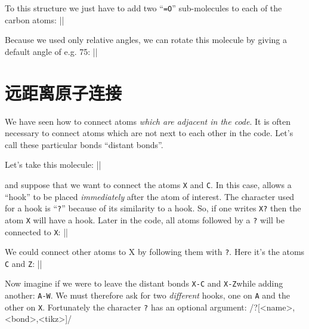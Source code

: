 \documentclass[10pt]{article}
\begin{document}
To this structure we just have to add two ``\verb/=O/'' sub-molecules to each of the carbon atoms:
||

Because we used only relative angles, we can rotate this molecule by giving a default angle of e.g. 75\degres:
||

\section{远距离原子连接}
We have seen how to connect atoms \emph{which are adjacent in the code}. It is often necessary to connect atoms which are not next to each other in the code. Let's call these particular bonds ``distant bonds''.

Let's take this molecule:
||

and suppose that we want to connect the atoms \verb/X/ and \verb/C/. In this case, \CF allows a ``hook'' to be placed \emph{immediately} after the atom of interest. The character used for a hook is ``\verb-?-'' because of its similarity to a hook. So, if one writes \verb/X?/ then the atom \verb/X/ will have a hook. Later in the code, all atoms followed by a \verb-?- will be connected to \verb/X/:
||

We could connect other atoms to X by following them with \verb-?-. Here it's the atoms \verb-C- and \verb-Z-:
||

Now imagine if we were to leave the distant bonds \verb/X-C/ and \verb/X-Z/while adding another: \verb/A-W/. We must therefore ask for two \emph{different} hooks, one on \verb/A/ and the other on \verb/X/. Fortunately the character \verb/?/ has an optional argument:
\centerverb/?[<name>,<bond>,<tikz>]/
\smallskip
\end{document}
